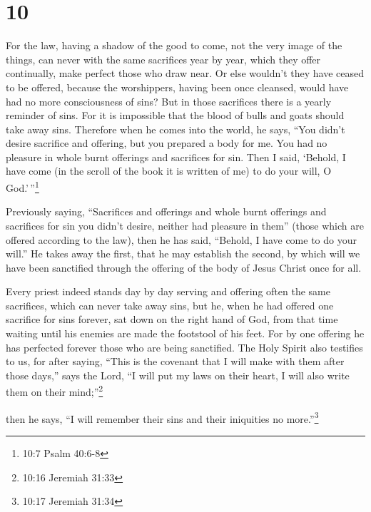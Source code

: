 \hypertarget{section-9}{%
\section{10}\label{section-9}}

 For the law, having a shadow of the good to come, not the
very image of the things, can never with the same sacrifices year by
year, which they offer continually, make perfect those who draw near.
 Or else wouldn't they have ceased to be offered, because
the worshippers, having been once cleansed, would have had no more
consciousness of sins?  But in those sacrifices there is a
yearly reminder of sins.  For it is impossible that the
blood of bulls and goats should take away sins.  Therefore
when he comes into the world, he says, ``You didn't desire sacrifice and
offering, but you prepared a body for me.  You had no
pleasure in whole burnt offerings and sacrifices for sin. 
Then I said, `Behold, I have come (in the scroll of the book it is
written of me) to do your will, O God.'\,''\footnote{10:7 Psalm 40:6-8}

 Previously saying, ``Sacrifices and offerings and whole
burnt offerings and sacrifices for sin you didn't desire, neither had
pleasure in them'' (those which are offered according to the law),
 then he has said, ``Behold, I have come to do your will.''
He takes away the first, that he may establish the second, 
by which will we have been sanctified through the offering of the body
of Jesus Christ once for all.

 Every priest indeed stands day by day serving and offering
often the same sacrifices, which can never take away sins, 
but he, when he had offered one sacrifice for sins forever, sat down on
the right hand of God,  from that time waiting until his
enemies are made the footstool of his feet.  For by one
offering he has perfected forever those who are being sanctified.
 The Holy Spirit also testifies to us, for after saying,
 ``This is the covenant that I will make with them after
those days,'' says the Lord, ``I will put my laws on their heart, I will
also write them on their mind;''\footnote{10:16 Jeremiah 31:33}

then he says,  ``I will remember their sins and their
iniquities no more.''\footnote{10:17 Jeremiah 31:34}


